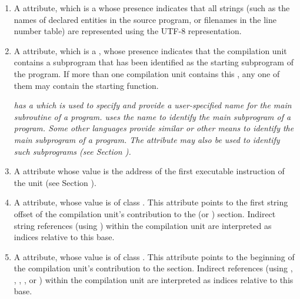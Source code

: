 \begin{enumerate}[1. ]
\item \hypertarget{chap:DWATuseUTF8compilationunitusesutf8strings}{}
A \DWATuseUTFeightDEFN{} attribute,
which is a  whose
presence indicates that all strings (such as the names of
declared entities in the source program, or filenames in the line number table) 
are represented using the UTF-8 representation. 

\item%
\hypertarget{chap:DWATmainsubprogramunitcontainingmainorstartingsubprogram}{}
A \DWATmainsubprogramDEFN{} attribute, 
which is a ,
whose presence indicates that the compilation unit contains a
subprogram that has been identified as the starting
subprogram of the program. If more than one compilation unit contains
this , any one of them may contain the starting 
function.

\textit{ has a 
which is used
to specify and provide a user-specified name for the main
subroutine of a program. 
 uses the name  to identify
the main subprogram of a program. Some other languages provide
similar or other means to identify the main subprogram of
a program. The \DWATmainsubprogram{} attribute may also be used to
identify such subprograms (see 
Section ).}

\item 
\hypertarget{chap:DWATentrypcofcompileunit}{}
\hypertarget{chap:DWATentrypcofpartialunit}{}
A \DWATentrypc{} attribute whose value is the address of the first
executable instruction of the unit (see 
Section ).

\item \hypertarget{chap:DWATstroffsetbaseforindirectstringtable}{}
A \DWATstroffsetsbaseDEFN{}
attribute, whose value is of class \CLASSstroffsetsptr. 
This attribute points to the first string
offset of the compilation unit's contribution to the
\dotdebugstroffsets{} (or \dotdebugstroffsetsdwo{}) section. 
Indirect string references
(using \DWFORMstrx) within the compilation unit are
interpreted as indices relative to this base.

\item \hypertarget{chap:DWATaddrbaseforaddresstable}{}
A \DWATaddrbaseDEFN{}
attribute, whose value is of class \CLASSaddrptr.
This attribute points to the beginning of the compilation
unit's contribution to the \dotdebugaddr{} section.
Indirect references (using \DWFORMaddrx, \DWOPaddrx, 
\DWOPconstx, \DWLLEbaseaddressselectionentry{}, 
\DWLLEstartendentry{} or \DWLLEstartlengthentry) 
within the compilation unit are interpreted as indices 
relative to this base.


\end{enumerate}

